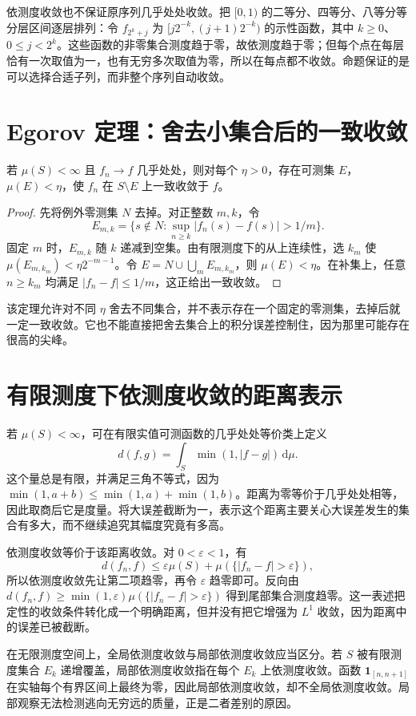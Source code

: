 \documentclass[UTF8,12pt,a4paper,fontset=fandol]{ctexbook}
\begin{document}
依测度收敛也不保证原序列几乎处处收敛。把 $[0,1)$ 的二等分、四等分、八等分等分层区间逐层排列：令 $f_{2^k+j}$ 为
$[j2^{-k},(j+1)2^{-k})$ 的示性函数，其中 $k\geq0$、$0\leq j<2^k$。这些函数的非零集合测度趋于零，故依测度趋于零；但每个点在每层恰有一次取值为一，也有无穷多次取值为零，所以在每点都不收敛。命题保证的是可以选择合适子列，而非整个序列自动收敛。

\section{Egorov 定理：舍去小集合后的一致收敛}
\begin{theorem}[Egorov 定理]
若 $\mu(S)<\infty$ 且 $f_n\to f$ 几乎处处，则对每个 $\eta>0$，存在可测集 $E$，$\mu(E)<\eta$，使 $f_n$ 在 $S\setminus E$ 上一致收敛于 $f$。
\label{thm:mt-egorov}
\end{theorem}
\begin{proof}
先将例外零测集 $N$ 去掉。对正整数 $m,k$，令
\[
 E_{m,k}=\{s\notin N:\sup_{n\geq k}|f_n(s)-f(s)|>1/m\}.
\]
固定 $m$ 时，$E_{m,k}$ 随 $k$ 递减到空集。由有限测度下的从上连续性，选 $k_m$ 使 $\mu(E_{m,k_m})<\eta2^{-m-1}$。令 $E=N\cup\bigcup_mE_{m,k_m}$，则 $\mu(E)<\eta$。在补集上，任意 $n\geq k_m$ 均满足 $|f_n-f|\leq1/m$，这正给出一致收敛。
\end{proof}
该定理允许对不同 $\eta$ 舍去不同集合，并不表示存在一个固定的零测集，去掉后就一定一致收敛。它也不能直接把舍去集合上的积分误差控制住，因为那里可能存在很高的尖峰。

\section{有限测度下依测度收敛的距离表示}
若 $\mu(S)<\infty$，可在有限实值可测函数的几乎处处等价类上定义
\[
 d(f,g)=\int_S\min(1,|f-g|)\,\mathrm d\mu.
\]
这个量总是有限，并满足三角不等式，因为
$\min(1,a+b)\leq\min(1,a)+\min(1,b)$。距离为零等价于几乎处处相等，因此取商后它是度量。将大误差截断为一，表示这个距离主要关心大误差发生的集合有多大，而不继续追究其幅度究竟有多高。

依测度收敛等价于该距离收敛。对 $0<\varepsilon<1$，有
\[
 d(f_n,f)\leq\varepsilon\mu(S)+\mu(\{|f_n-f|>\varepsilon\}),
\]
所以依测度收敛先让第二项趋零，再令 $\varepsilon$ 趋零即可。反向由
$d(f_n,f)\geq\min(1,\varepsilon)\mu(\{|f_n-f|>\varepsilon\})$
得到尾部集合测度趋零。这一表述把定性的收敛条件转化成一个明确距离，但并没有把它增强为 $L^1$ 收敛，因为距离中的误差已被截断。

在无限测度空间上，全局依测度收敛与局部依测度收敛应当区分。若 $S$ 被有限测度集合 $E_k$ 递增覆盖，局部依测度收敛指在每个 $E_k$ 上依测度收敛。函数 $\mathbf1_{[n,n+1]}$ 在实轴每个有界区间上最终为零，因此局部依测度收敛，却不全局依测度收敛。局部观察无法检测逃向无穷远的质量，正是二者差别的原因。
\end{document}
